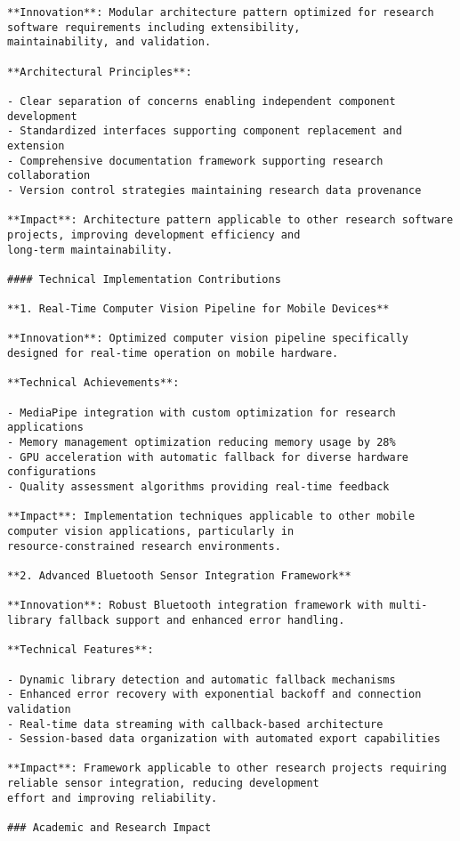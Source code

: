 \documentclass[12pt,a4paper]{report}
\begin{document}
\begin{verbatim}
**Innovation**: Modular architecture pattern optimized for research software requirements including extensibility,
maintainability, and validation.

**Architectural Principles**:

- Clear separation of concerns enabling independent component development
- Standardized interfaces supporting component replacement and extension
- Comprehensive documentation framework supporting research collaboration
- Version control strategies maintaining research data provenance

**Impact**: Architecture pattern applicable to other research software projects, improving development efficiency and
long-term maintainability.

#### Technical Implementation Contributions

**1. Real-Time Computer Vision Pipeline for Mobile Devices**

**Innovation**: Optimized computer vision pipeline specifically designed for real-time operation on mobile hardware.

**Technical Achievements**:

- MediaPipe integration with custom optimization for research applications
- Memory management optimization reducing memory usage by 28%
- GPU acceleration with automatic fallback for diverse hardware configurations
- Quality assessment algorithms providing real-time feedback

**Impact**: Implementation techniques applicable to other mobile computer vision applications, particularly in
resource-constrained research environments.

**2. Advanced Bluetooth Sensor Integration Framework**

**Innovation**: Robust Bluetooth integration framework with multi-library fallback support and enhanced error handling.

**Technical Features**:

- Dynamic library detection and automatic fallback mechanisms
- Enhanced error recovery with exponential backoff and connection validation
- Real-time data streaming with callback-based architecture
- Session-based data organization with automated export capabilities

**Impact**: Framework applicable to other research projects requiring reliable sensor integration, reducing development
effort and improving reliability.

### Academic and Research Impact


\end{verbatim}
\end{document}
